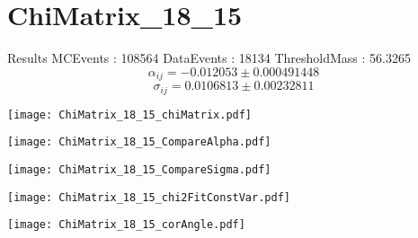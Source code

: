 \documentclass[a4paper,12pt]{article}
\begin{document}
\section{ChiMatrix\_18\_15}
\begin{minipage}{0.49\linewidth} Results \newline
MCEvents : 108564\newline
DataEvents : 18134 \newline
ThresholdMass : 56.3265\\
$$\alpha_{ij} = -0.012053\pm 0.000491448$$
$$\sigma_{ij} = 0.0106813\pm 0.00232811$$
\end{minipage}\hfill
\begin{minipage}{0.49\linewidth} 
\texttt{[image: ChiMatrix\_18\_15\_chiMatrix.pdf]}\\
\end{minipage}
\hfill
\begin{minipage}{0.49\linewidth} 
\texttt{[image: ChiMatrix\_18\_15\_CompareAlpha.pdf]}\\
\end{minipage}
\hfill
\begin{minipage}{0.49\linewidth} 
\texttt{[image: ChiMatrix\_18\_15\_CompareSigma.pdf]}\\
\end{minipage}
\begin{minipage}{0.49\linewidth} 
\texttt{[image: ChiMatrix\_18\_15\_chi2FitConstVar.pdf]}\\
\end{minipage}
\hfill
\begin{minipage}{0.49\linewidth} 
\texttt{[image: ChiMatrix\_18\_15\_corAngle.pdf]}\\
\end{minipage}
\end{document}
